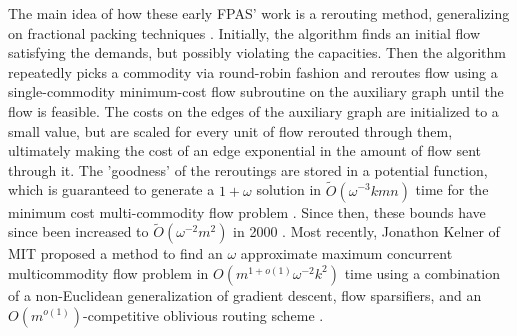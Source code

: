 The main idea of how
these early FPAS' work is a rerouting method, generalizing on
fractional packing techniques \cite{karger}.
Initially, the
algorithm finds an initial flow satisfying the demands, but possibly
violating the capacities. Then the algorithm repeatedly
picks a commodity via round-robin fashion and reroutes flow using a
single-commodity minimum-cost flow subroutine on the auxiliary graph until the flow is feasible. The costs
on the edges of the auxiliary graph are initialized to a small value,
but are scaled for every unit of flow rerouted through them, ultimately
making the cost of an edge exponential in the amount of flow sent
through it. The 'goodness' of the reroutings are stored in a potential function, which
is guaranteed to generate a $1+\omega$ solution in
$\tilde{O}(\omega^{-3}kmn)$ time for the minimum cost multi-commodity flow
problem \cite{karger}. 
Since then, these bounds have since been increased to
$\tilde{O}(\omega^{-2}m^2)$ in 2000 \cite{grig}. 
Most recently, Jonathon Kelner of MIT proposed a method to find an $\omega$ approximate maximum concurrent multicommodity flow problem
in  $O(m^{1+o(1)}\omega^{-2}k^2)$ time
using a combination of a
non-Euclidean generalization of gradient descent, flow sparsifiers,
and an $O(m^{o(1)})$-competitive oblivious routing scheme \cite{almostLinear}. 
